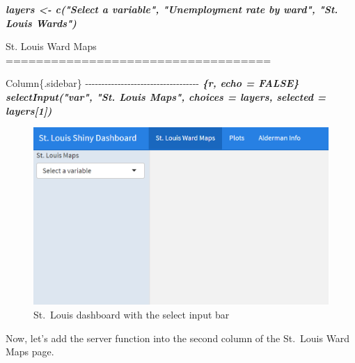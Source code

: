 \documentclass[
  krantz2]{krantz}
\makeatletter
\newenvironment{Shaded}{\begin{snugshade}}{\end{snugshade}}
\newcommand{\FunctionTok}[1]{\textcolor[rgb]{0,0,0}{#1}}
\newcommand{\InformationTok}[1]{\textcolor[rgb]{0.37,0.37,0.37}{\textbf{\textit{#1}}}}
\newcommand{\NormalTok}[1]{#1}
\newenvironment{kframe}{%
\medskip{}
\setlength{\fboxsep}{.8em}
 \def\at@end@of@kframe{}%
 \ifinner\ifhmode%
  \def\at@end@of@kframe{\end{minipage}}%
  \begin{minipage}{\columnwidth}%
 \fi\fi%
 \def\FrameCommand##1{\hskip\@totalleftmargin \hskip-\fboxsep
 \colorbox{shadecolor}{##1}\hskip-\fboxsep
     \hskip-\linewidth \hskip-\@totalleftmargin \hskip\columnwidth}%
 \MakeFramed {\advance\hsize-\width
   \@totalleftmargin\z@ \linewidth\hsize
   \@setminipage}}%
 {\par\unskip\endMakeFramed%
 \at@end@of@kframe}
\renewenvironment{Shaded}{\begin{kframe}}{\end{kframe}}
\makeatother
\begin{document}
\begin{Shaded}
\begin{Highlighting}[]
\InformationTok{layers \textless{}{-} c("Select a variable", "Unemployment rate by ward", "St. Louis Wards")}
\InformationTok{\textasciigrave{}\textasciigrave{}\textasciigrave{}}


\NormalTok{St. Louis Ward Maps}
\FunctionTok{===================================}

\NormalTok{Column\{.sidebar\}}
\NormalTok{{-}{-}{-}{-}{-}{-}{-}{-}{-}{-}{-}{-}{-}{-}{-}{-}{-}{-}{-}{-}{-}{-}{-}{-}{-}{-}{-}{-}{-}{-}{-}{-}{-}{-}{-}}
\InformationTok{\textasciigrave{}\textasciigrave{}\textasciigrave{}\{r, echo = FALSE\}}
\InformationTok{ selectInput("var", "St. Louis Maps", choices = layers, selected = layers[1])}

\InformationTok{\textasciigrave{}\textasciigrave{}\textasciigrave{}}

\end{Highlighting}
\end{Shaded}

\begin{figure}
\centering
\includegraphics{images/shiny_dashboard1.png}
\caption{St.~Louis dashboard with the select input bar}
\end{figure}

Now, let's add the server function into the second column of the St.~Louis Ward Maps page.
\end{document}
